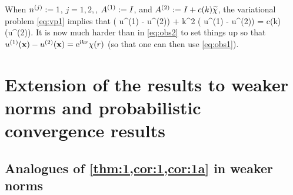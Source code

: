 When $n^{(j)}:=1$, $j=1,2,$, ${A}^{(1)}:=I$, and ${A}^{(2)}:= I + c(k)\widetilde{\chi}$, the variational problem \cref{eq:vp1} implies that 
\beqs%
\Delta \big( u^{(1)} - u^{(2)}\big) + k^2 \big( u^{(1)} - u^{(2)}\big) = c(k)\nabla\cdot \big(\widetilde{\chi}\nabla u^{(2)}\big).
\eeqs
It is now much harder than in \cref{eq:obs2} to set things up so that $ u^{(1)}(\mathbf{x}) - u^{(2)}(\mathbf{x})=\mathrm{e}^{\mathrm{i} kr}\chi(r)$ (so that one can then use \cref{eq:obs1}).
\ere


\section{Extension of the results to weaker norms and probabilistic convergence results}
\subsection{Analogues of \cref{thm:1,cor:1,cor:1a} in weaker norms}\label{sec:weaknorm}

